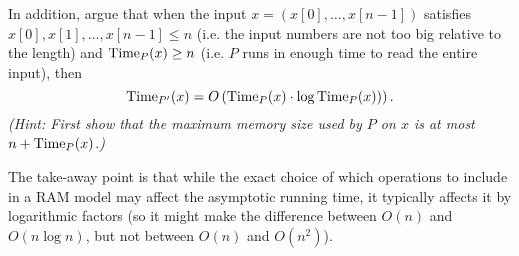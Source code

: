 \documentclass[11pt]{article}
\begin{document}
\begin{enumerate}
\begin{enumerate}
    In addition, argue that 
    when the input $x=(x[0],\ldots,x[n-1])$ satisfies $x[0],x[1],\ldots,x[n-1]\leq n$ (i.e. the input numbers are not too big relative to the length) and $\mathrm{Time}_P(x)\geq n$ (i.e. $P$ runs in enough time to read the entire input), then 
    $$\mathrm{Time}_{P'}(x) = O\left(\mathrm{Time}_{P}(x) \cdot \log \mathrm{Time}_P(x))\right).$$
    \emph{(Hint: First show that the maximum memory size used by $P$ on $x$ is at most $n+\mathrm{Time}_P(x)$.)}
    
\end{enumerate}
       
The take-away point is that while the exact choice of which operations to include in a RAM model may affect the asymptotic running time, it typically affects it by logarithmic factors (so it might make the difference between $O(n)$ and $O(n\log n)$, but not between $O(n)$ and $O(n^2)$).
  
\end{enumerate}
\end{document}
